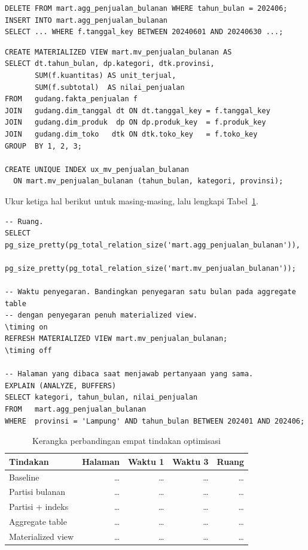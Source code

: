 \begin{lstlisting}[style=sqlgaya]
DELETE FROM mart.agg_penjualan_bulanan WHERE tahun_bulan = 202406;
INSERT INTO mart.agg_penjualan_bulanan
SELECT ... WHERE f.tanggal_key BETWEEN 20240601 AND 20240630 ...;
\end{lstlisting}


\begin{lstlisting}[style=sqlgaya]
CREATE MATERIALIZED VIEW mart.mv_penjualan_bulanan AS
SELECT dt.tahun_bulan, dp.kategori, dtk.provinsi,
       SUM(f.kuantitas) AS unit_terjual,
       SUM(f.subtotal)  AS nilai_penjualan
FROM   gudang.fakta_penjualan f
JOIN   gudang.dim_tanggal dt ON dt.tanggal_key = f.tanggal_key
JOIN   gudang.dim_produk  dp ON dp.produk_key  = f.produk_key
JOIN   gudang.dim_toko   dtk ON dtk.toko_key   = f.toko_key
GROUP  BY 1, 2, 3;

CREATE UNIQUE INDEX ux_mv_penjualan_bulanan
  ON mart.mv_penjualan_bulanan (tahun_bulan, kategori, provinsi);
\end{lstlisting}


Ukur ketiga hal berikut untuk masing-masing, lalu lengkapi
Tabel~\ref{tab:m6-perbandingan}.

\begin{lstlisting}[style=sqlgaya]
-- Ruang.
SELECT pg_size_pretty(pg_total_relation_size('mart.agg_penjualan_bulanan')),
       pg_size_pretty(pg_total_relation_size('mart.mv_penjualan_bulanan'));

-- Waktu penyegaran. Bandingkan penyegaran satu bulan pada aggregate table
-- dengan penyegaran penuh materialized view.
\timing on
REFRESH MATERIALIZED VIEW mart.mv_penjualan_bulanan;
\timing off

-- Halaman yang dibaca saat menjawab pertanyaan yang sama.
EXPLAIN (ANALYZE, BUFFERS)
SELECT kategori, tahun_bulan, nilai_penjualan
FROM   mart.agg_penjualan_bulanan
WHERE  provinsi = 'Lampung' AND tahun_bulan BETWEEN 202401 AND 202406;
\end{lstlisting}

\begin{table}[htbp]
\centering
\small
\caption{Kerangka perbandingan empat tindakan optimisasi}
\label{tab:m6-perbandingan}
\begin{tabular}{@{}p{}rrrr@{}}
\toprule
\textbf{Tindakan} & \textbf{Halaman} & \textbf{Waktu 1} & \textbf{Waktu 3} &
  \textbf{Ruang} \\
\midrule
Baseline & \ldots & \ldots & \ldots & \ldots \\
Partisi bulanan & \ldots & \ldots & \ldots & \ldots \\
Partisi + indeks & \ldots & \ldots & \ldots & \ldots \\
Aggregate table & \ldots & \ldots & \ldots & \ldots \\
Materialized view & \ldots & \ldots & \ldots & \ldots \\
\bottomrule
\end{tabular}
\end{table}

